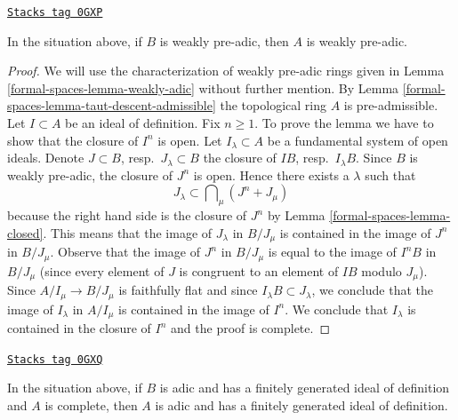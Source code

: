 \begin{lemma}
\label{formal-spaces-lemma-taut-descent-weakly-adic}
\href{https://stacks.math.columbia.edu/tag/0GXP}{\texttt{Stacks tag 0GXP}}

In the situation above, if $B$ is weakly pre-adic, then $A$
is weakly pre-adic.
\end{lemma}

\begin{proof}
We will use the characterization of weakly pre-adic rings given in
Lemma \ref{formal-spaces-lemma-weakly-adic} without further mention.
By Lemma \ref{formal-spaces-lemma-taut-descent-admissible}
the topological ring $A$ is pre-admissible.
Let $I \subset A$ be an ideal of definition.
Fix $n \geq 1$. To prove the lemma we have
to show that the closure of $I^n$ is open.
Let $I_\lambda \subset A$ be a fundamental system of open ideals.
Denote $J \subset B$, resp.\ $J_\lambda \subset B$
the closure of $IB$, resp.\ $I_\lambda B$.
Since $B$ is weakly pre-adic, the closure of $J^n$ is open.
Hence there exists a $\lambda$ such that
$$
J_\lambda \subset \bigcap\nolimits_\mu (J^n + J_\mu)
$$
because the right hand side is the closure of $J^n$ by
Lemma \ref{formal-spaces-lemma-closed}.
This means that the image of $J_\lambda$ in $B/J_\mu$ is contained in the
image of $J^n$ in $B/J_\mu$. Observe that the image of $J^n$ in
$B/J_\mu$ is equal to the image of $I^nB$ in $B/J_\mu$ (since every element
of $J$ is congruent to an element of $IB$ modulo $J_\mu$).
Since $A/I_\mu \to B/J_\mu$ is faithfully flat and since
$I_\lambda B \subset J_\lambda$,
we conclude that the image of $I_\lambda$ in $A/I_\mu$
is contained in the image of $I^n$.
We conclude that $I_\lambda$ is contained in the closure
of $I^n$ and the proof is complete.
\end{proof}

\begin{lemma}
\label{formal-spaces-lemma-taut-descent-adic-star}
\href{https://stacks.math.columbia.edu/tag/0GXQ}{\texttt{Stacks tag 0GXQ}}

In the situation above, if $B$ is adic and has a finitely generated
ideal of definition and $A$ is complete, then $A$ is adic and
has a finitely generated ideal of definition.
\end{lemma}

